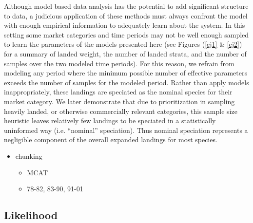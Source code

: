 \documentclass[12pt]{article}
\begin{document}
%
Although model based data analysis has the potential to add significant
structure to data, a judicious application of these methods must always
confront the model with enough empirical information to adequately learn
about the system. In this setting some market categories and time
periods may not be well enough sampled to learn the parameters of the
models presented here (see Figures (\ref{ej1} \& \ref{ej2}) for a summary of 
landed weight, the number of landed strata, and the number of samples over the 
two modeled time periods). For this reason, we refrain from modeling any 
period where the minimum possible number of effective parameters exceeds the 
number of samples for the modeled period. Rather than apply models 
inappropriately, these landings are speciated as the nominal species for their 
market category. We later demonstrate that due to prioritization in sampling 
heavily landed, or otherwise commercially relevant categories, this sample 
size heuristic leaves relatively few landings to be speciated in a 
statistically uninformed way (i.e.  ``nominal'' speciation). Thus nominal 
speciation represents a negligible component of the overall expanded landings 
for most species.



{\color{red}
\begin{itemize}
\item chunking
	\begin{itemize}
	\item MCAT
	\item 78-82, 83-90, 91-01
	\end{itemize}
\end{itemize}
}

%
%
\subsection{Likelihood}
%
%
\end{document}

